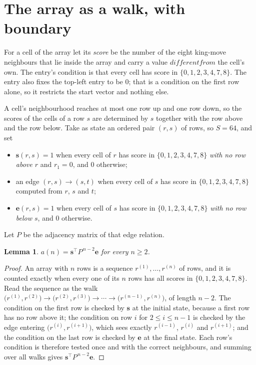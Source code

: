 \documentclass[11pt,a4paper]{article}
\theoremstyle{plain}
\newtheorem{lemma}[theorem]{Lemma}
\theoremstyle{definition}
\begin{document}
\section{The array as a walk, with boundary}

For a cell of the array let its \emph{score} be the number of the eight king-move neighbours that lie inside
the array and carry a value $different from$ the cell's own. The entry's condition is that every cell
has score in $\{0,1,2,3,4,7,8\}$. The entry also fixes the top-left entry to be $0$; that is a condition on the first row alone, so it restricts the start vector and nothing else.

A cell's neighbourhood reaches at most one row up and one row down, so the scores of the
cells of a row $s$ are determined by $s$ together with the row above and the row below.
Take as state an ordered pair $(r,s)$ of rows, so $S=64$, and set
\begin{itemize}
\item $\mathbf{s}(r,s)=1$ when every cell of $r$ has score in $\{0,1,2,3,4,7,8\}$ \emph{with no row
above $r$} and $r_1=0$, and $0$ otherwise;
\item an edge $(r,s)\to(s,t)$ when every cell of $s$ has score in $\{0,1,2,3,4,7,8\}$ computed from
$r$, $s$ and $t$;
\item $\mathbf{e}(r,s)=1$ when every cell of $s$ has score in $\{0,1,2,3,4,7,8\}$ \emph{with no row
below $s$}, and $0$ otherwise.
\end{itemize}
Let $P$ be the adjacency matrix of that edge relation.

\begin{lemma}\label{lem:walk}
$a(n)=\mathbf{s}^{\!\top}P^{\,n-2}\mathbf{e}$ for every $n\ge2$.
\end{lemma}

\begin{proof}
An array with $n$ rows is a sequence $r^{(1)},\dots,r^{(n)}$ of rows, and it is counted
exactly when every one of its $n$ rows has all scores in $\{0,1,2,3,4,7,8\}$. Read the sequence as the
walk $\bigl(r^{(1)},r^{(2)}\bigr)\to\bigl(r^{(2)},r^{(3)}\bigr)\to\cdots\to
\bigl(r^{(n-1)},r^{(n)}\bigr)$, of length $n-2$. The condition on the first row is
checked by $\mathbf{s}$ at the initial state, because a first row has no row above it; the
condition on row $i$ for $2\le i\le n-1$ is checked by the edge entering
$\bigl(r^{(i)},r^{(i+1)}\bigr)$, which sees exactly $r^{(i-1)}$, $r^{(i)}$ and
$r^{(i+1)}$; and the condition on the last row is checked by $\mathbf{e}$ at the final
state. Each row's condition is therefore tested once and with the correct neighbours, and
summing over all walks gives $\mathbf{s}^{\!\top}P^{\,n-2}\mathbf{e}$.
\end{proof}
\end{document}
